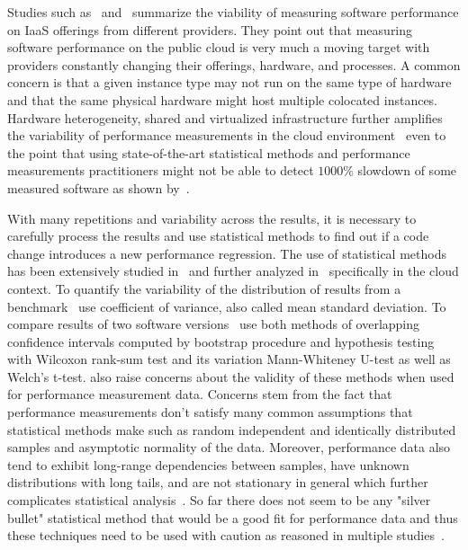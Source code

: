 Studies such as~\citet{leitner2016patterns} and~\citet{laaber2019software} summarize the viability of measuring software performance on IaaS offerings from different providers.
They point out that measuring software performance on the public cloud is very much a moving target with providers constantly changing their offerings, hardware, and processes.
A common concern is that a given instance type may not run on the same type of hardware and that the same physical hardware might host multiple colocated instances.
Hardware heterogeneity, shared and virtualized infrastructure further amplifies the variability of performance measurements in the cloud environment~\cite{leitner2016patterns} even to the point that using state-of-the-art statistical methods and performance measurements practitioners might not be able to detect $1000\%$ slowdown of some measured software as shown by~\citet{laaber2019software}.

With many repetitions and variability across the results, it is necessary to carefully process the results and use statistical methods to find out if a code change introduces a new performance regression.
The use of statistical methods has been extensively studied in~\citet{bulej2017stat} and further analyzed in~\citet{laaber2019software} specifically in the cloud context.
To quantify the variability of the distribution of results from a benchmark~\citet{laaber2019software} use coefficient of variance, also called mean standard deviation.
To compare results of two software versions~\citet{bulej2017stat} use both methods of overlapping confidence intervals computed by bootstrap procedure and hypothesis testing with Wilcoxon rank-sum test and its variation Mann-Whiteney U-test as well as Welch's t-test.
\citet{bulej2017stat} also raise concerns about the validity of these methods when used for performance measurement data.
Concerns stem from the fact that performance measurements don't satisfy many common assumptions that statistical methods make such as random independent and identically distributed samples and asymptotic normality of the data.
Moreover, performance data also tend to exhibit long-range dependencies between samples, have unknown distributions with long tails, and are not stationary in general which further complicates statistical analysis~\cite{bulej2017stat}.
So far there does not seem to be any "silver bullet" statistical method that would be a good fit for performance data and thus these techniques need to be used with caution as reasoned in multiple studies~\cite{leitner2016patterns, laaber2019software, bulej2017stat}.

